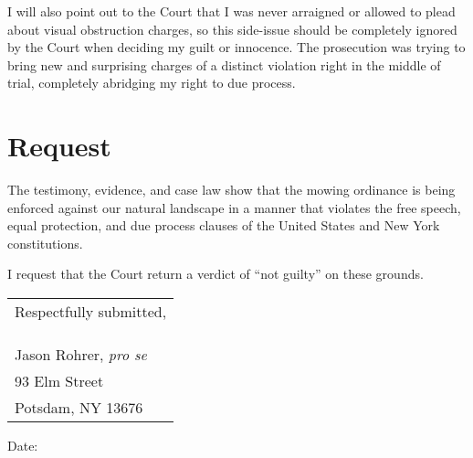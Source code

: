 \documentclass[12pt]{article}
\begin{document}
I will also point out to the Court that I was never arraigned or allowed to plead about visual obstruction charges, so this side-issue should be completely ignored by the Court when deciding my guilt or innocence.
The prosecution was trying to bring new and surprising charges of a distinct violation right in the middle of trial, completely abridging my right to due process. 
    

\section{Request}

The testimony, evidence, and case law show that the mowing ordinance is being enforced against our natural landscape in a manner that violates the free speech, equal protection, and due process clauses of the United States and New York constitutions.

I request that the Court return a verdict of ``not guilty'' on these grounds.

   


\begin{flushright}
\begin{tabular}{l}
Respectfully submitted,\\
\\
\\
\hline
\\
Jason Rohrer, {\em pro se}\\
93 Elm Street\\
Potsdam, NY 13676
\end{tabular}
\end{flushright}
Date:\underline{\hspace{2in}}
\end{document}
